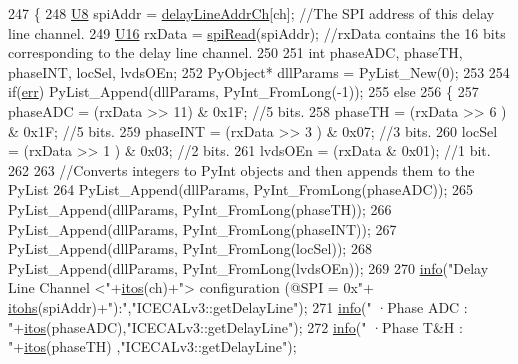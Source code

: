 \begin{DoxyCode}
247 \{                            
248     \hyperlink{ICECALv3_8h_a3cb25ca6f51f003950f9625ff05536fc}{U8} spiAddr = \hyperlink{ICECALv3_8h_a848408b773702d268053cb49d205e097}{delayLineAddrCh}[ch];          \textcolor{comment}{//The SPI address of this delay line
       channel.}
249     \hyperlink{ICECALv3_8h_adf928e51a60dba0df29d615401cc55a8}{U16} rxData = \hyperlink{classICECALv3_aced41ce20a0853d6248b8df88412e57a}{spiRead}(spiAddr);                \textcolor{comment}{//rxData contains the 16 bits corresponding to
       the delay line channel.}
250 
251     \textcolor{keywordtype}{int} phaseADC, phaseTH, phaseINT, locSel, lvdsOEn;
252     PyObject* dllParams = PyList\_New(0);
253 
254     \textcolor{keywordflow}{if}(\hyperlink{classICECALv3_ad8989925ee5b3ff322d863ce6aaff0bd}{err}) PyList\_Append(dllParams, PyInt\_FromLong(-1));
255     \textcolor{keywordflow}{else}
256     \{
257         phaseADC = (rxData >> 11) & 0x1F;       \textcolor{comment}{//5 bits.}
258         phaseTH  = (rxData >> 6 ) & 0x1F;       \textcolor{comment}{//5 bits.}
259         phaseINT = (rxData >> 3 ) & 0x07;       \textcolor{comment}{//3 bits.}
260         locSel   = (rxData >> 1 ) & 0x03;       \textcolor{comment}{//2 bits.}
261         lvdsOEn  = (rxData & 0x01);                 \textcolor{comment}{//1 bit.}
262 
263         \textcolor{comment}{//Converts integers to PyInt objects and then appends them to the PyList}
264         PyList\_Append(dllParams, PyInt\_FromLong(phaseADC));
265         PyList\_Append(dllParams, PyInt\_FromLong(phaseTH));
266         PyList\_Append(dllParams, PyInt\_FromLong(phaseINT));
267         PyList\_Append(dllParams, PyInt\_FromLong(locSel));
268         PyList\_Append(dllParams, PyInt\_FromLong(lvdsOEn));
269 
270         \hyperlink{classObject_a644fd329ea4cb85f54fa6846484b84a8}{info}(\textcolor{stringliteral}{"Delay Line Channel <"}+\hyperlink{Tools_8h_af330027dbdafb9a30768b3613c553e60}{itos}(ch)+\textcolor{stringliteral}{"> configuration (@SPI = 0x"}+
      \hyperlink{classICECALv3_a04b02e583f191bfce34d05132cd23834}{itohs}(spiAddr)+\textcolor{stringliteral}{"):"},\textcolor{stringliteral}{"ICECALv3::getDelayLine"});
271         \hyperlink{classObject_a644fd329ea4cb85f54fa6846484b84a8}{info}(\textcolor{stringliteral}{"   ·Phase ADC          : "}+\hyperlink{Tools_8h_af330027dbdafb9a30768b3613c553e60}{itos}(phaseADC),\textcolor{stringliteral}{"ICECALv3::getDelayLine"});
272         \hyperlink{classObject_a644fd329ea4cb85f54fa6846484b84a8}{info}(\textcolor{stringliteral}{"   ·Phase T&H          : "}+\hyperlink{Tools_8h_af330027dbdafb9a30768b3613c553e60}{itos}(phaseTH) ,\textcolor{stringliteral}{"ICECALv3::getDelayLine"});

\end{DoxyCode}
